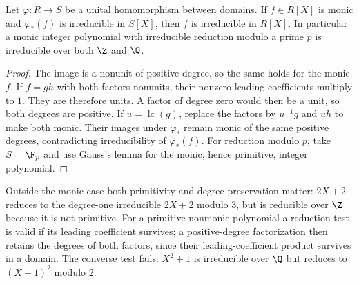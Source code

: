 \begin{proposition}\label{prop:irreducible-reduction}
Let $\varphi:R\to S$ be a unital homomorphism between domains.
If $f\in R[X]$ is monic and $\varphi_*(f)$ is irreducible in
$S[X]$, then $f$ is irreducible in $R[X]$.
In particular a monic integer polynomial with irreducible reduction
modulo a prime $p$ is irreducible over both $\Z$ and $\Q$.
\end{proposition}
\begin{proof}
The image is a nonunit of positive degree, so the same holds for the
monic $f$. If $f=gh$ with both factors nonunits, their nonzero
leading coefficients multiply to $1$. They are therefore units.
A factor of degree zero would then be a unit, so both degrees are
positive. If $u=\operatorname{lc}(g)$, replace the factors by
$u^{-1}g$ and $uh$ to make both monic. Their images under
$\varphi_*$ remain monic of the same positive degrees, contradicting
irreducibility of $\varphi_*(f)$.
For reduction modulo $p$, take $S=\F_p$ and use Gauss's lemma for
the monic, hence primitive, integer polynomial.
\end{proof}
Outside the monic case both primitivity and degree preservation matter:
$2X+2$ reduces to the degree-one irreducible $2X+2$ modulo $3$,
but is reducible over $\Z$ because it is not primitive. For a
primitive nonmonic polynomial a reduction test is valid if its
leading coefficient survives; a positive-degree factorization then
retains the degrees of both factors, since their leading-coefficient
product survives in a domain. The converse test fails: $X^2+1$ is
irreducible over $\Q$ but reduces to $(X+1)^2$ modulo $2$.

